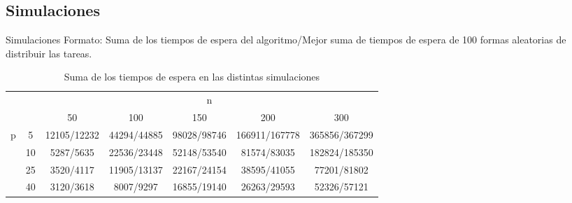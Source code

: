 \documentclass[serif,9pt]{beamer}
\begin{document}
\subsection{Simulaciones}

\begin{frame}{Simulaciones}
  Formato: Suma de los tiempos de espera del algoritmo/Mejor suma de
  tiempos de espera de 100 formas aleatorias de distribuir las tareas.
\begin{table}[H]
\centering
\caption*{Suma de los tiempos de espera en las distintas simulaciones}
\label{tabla:simulaciones}
\begin{adjustwidth}{-11.5mm}{}
\begin{tabular}{|c|c|c|c|c|c|c|}
\hline
\multicolumn{2}{|c|}{\multirow{2}{*}{}} & \multicolumn{5}{c|}{n}     \\ \cline{3-7} 
\multicolumn{2}{|c|}{}                  & 50 & 100 & 150 & 200 & 300 \\ \hline
\multirow{4}{*}{p}         & 5          & 12105/12232 & 44294/44885 & 98028/98746 & 166911/167778 & 365856/367299 \\ \cline{2-7} 
                           & 10         & 5287/5635 & 22536/23448 & 52148/53540 & 81574/83035 & 182824/185350 \\ \cline{2-7} 
                           & 25         & 3520/4117 & 11905/13137 & 22167/24154 & 38595/41055 & 77201/81802 \\ \cline{2-7} 
                           & 40         & 3120/3618 & 8007/9297 & 16855/19140 & 26263/29593 & 52326/57121 \\ \hline
\end{tabular}
\end{adjustwidth}
\end{table}
\end{frame}
\end{document}
